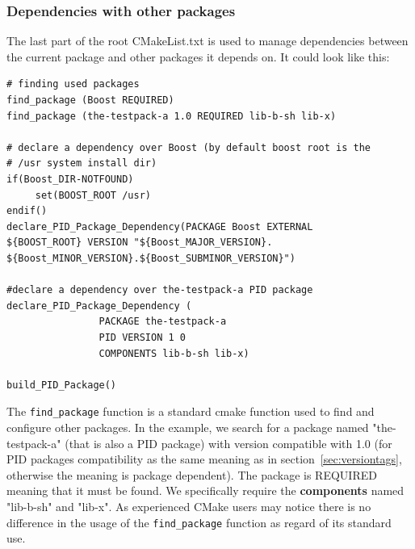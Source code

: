 \documentclass[12pt,a4paper]{article}
\begin{document}
\subsubsection{Dependencies with other packages}
\label{sec:rootCMakeDeps}

The last part of the root CMakeList.txt is used to manage dependencies between the current package and other packages it depends on. It could look like this:

\begin{verbatim}
# finding used packages
find_package (Boost REQUIRED)
find_package (the-testpack-a 1.0 REQUIRED lib-b-sh lib-x)

# declare a dependency over Boost (by default boost root is the 
# /usr system install dir)
if(Boost_DIR-NOTFOUND)
     set(BOOST_ROOT /usr)
endif()
declare_PID_Package_Dependency(PACKAGE Boost EXTERNAL 
${BOOST_ROOT} VERSION "${Boost_MAJOR_VERSION}.
${Boost_MINOR_VERSION}.${Boost_SUBMINOR_VERSION}")

#declare a dependency over the-testpack-a PID package
declare_PID_Package_Dependency (
                PACKAGE the-testpack-a
                PID VERSION 1 0 
                COMPONENTS lib-b-sh lib-x)
                
build_PID_Package()
\end{verbatim}

The \texttt{find\_package} function is a standard cmake function used to find and configure other packages. In the example, we search for a package named "the-testpack-a" (that is also a PID package) with version compatible with 1.0 (for PID packages compatibility as the same meaning as in section~\ref{sec:versiontags}, otherwise the meaning is package dependent). The package is REQUIRED meaning that it must be found.  We specifically require the \textbf{components} named "lib-b-sh" and "lib-x". As experienced CMake users may notice there is no difference in the usage of the \texttt{find\_package} function as regard of its standard use. 
\end{document}

